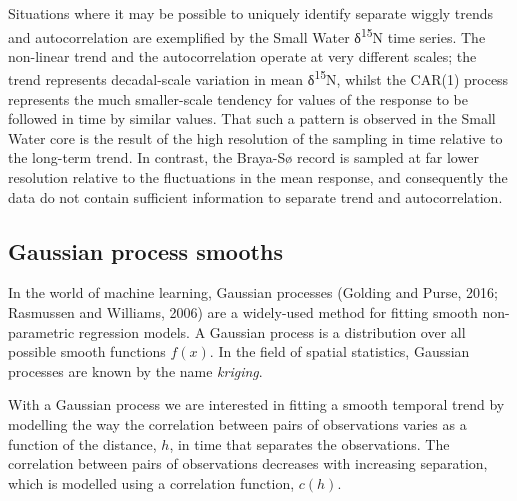\documentclass[12pt,]{article}
\begin{document}
Situations where it may be possible to uniquely identify separate wiggly
trends and autocorrelation are exemplified by the Small Water
δ\textsuperscript{15}N time series. The non-linear trend and the
autocorrelation operate at very different scales; the trend represents
decadal-scale variation in mean δ\textsuperscript{15}N, whilst the
CAR(1) process represents the much smaller-scale tendency for values of
the response to be followed in time by similar values. That such a
pattern is observed in the Small Water core is the result of the high
resolution of the sampling in time relative to the long-term trend. In
contrast, the Braya-Sø record is sampled at far lower resolution
relative to the fluctuations in the mean response, and consequently the
data do not contain sufficient information to separate trend and
autocorrelation.

\subsection{Gaussian process smooths}\label{gaussian-process-smooths}

In the world of machine learning, Gaussian processes (Golding and Purse,
2016; Rasmussen and Williams, 2006) are a widely-used method for fitting
smooth non-parametric regression models. A Gaussian process is a
distribution over all possible smooth functions \(f(x)\). In the field
of spatial statistics, Gaussian processes are known by the name
\emph{kriging}.

With a Gaussian process we are interested in fitting a smooth temporal
trend by modelling the way the correlation between pairs of observations
varies as a function of the distance, \(h\), in time that separates the
observations. The correlation between pairs of observations decreases
with increasing separation, which is modelled using a correlation
function, \(c(h)\).
\end{document}
